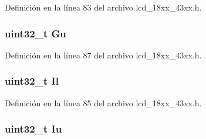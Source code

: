 Definición en la línea 83 del archivo lcd\+\_\+18xx\+\_\+43xx.\+h.

\subsubsection[{\texorpdfstring{Gu}{Gu}}]{\setlength{\rightskip}{0pt plus 5cm}uint32\+\_\+t Gu}\hypertarget{struct_l_c_d___p_a_l_e_t_t_e___e_n_t_r_y___t_a5c500dbd0da9c6dee01113a75681c8e6}{}\label{struct_l_c_d___p_a_l_e_t_t_e___e_n_t_r_y___t_a5c500dbd0da9c6dee01113a75681c8e6}


Definición en la línea 87 del archivo lcd\+\_\+18xx\+\_\+43xx.\+h.

\subsubsection[{\texorpdfstring{Il}{Il}}]{\setlength{\rightskip}{0pt plus 5cm}uint32\+\_\+t Il}\hypertarget{struct_l_c_d___p_a_l_e_t_t_e___e_n_t_r_y___t_ad84ec1984fc01412c8b23c488a1c6e34}{}\label{struct_l_c_d___p_a_l_e_t_t_e___e_n_t_r_y___t_ad84ec1984fc01412c8b23c488a1c6e34}


Definición en la línea 85 del archivo lcd\+\_\+18xx\+\_\+43xx.\+h.

\subsubsection[{\texorpdfstring{Iu}{Iu}}]{\setlength{\rightskip}{0pt plus 5cm}uint32\+\_\+t Iu}\hypertarget{struct_l_c_d___p_a_l_e_t_t_e___e_n_t_r_y___t_a4b21dc5839317ff52328d54c8c162728}{}\label{struct_l_c_d___p_a_l_e_t_t_e___e_n_t_r_y___t_a4b21dc5839317ff52328d54c8c162728}


